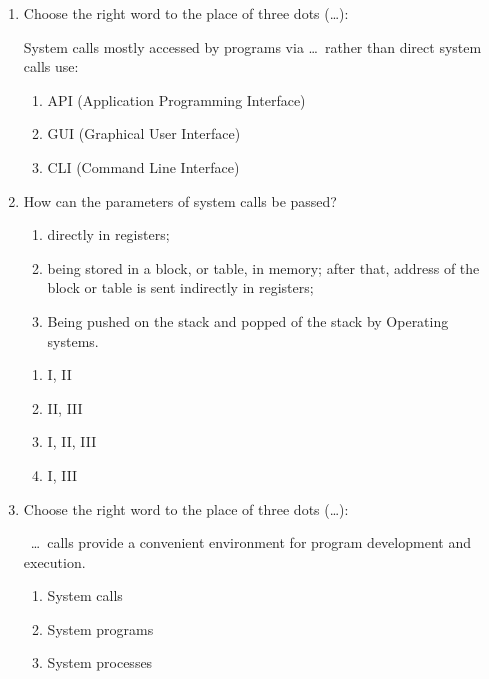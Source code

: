 \documentclass[paper=8.2in:11.6in]{scrartcl}
\begin{document}

\begin{enumerate}

\item Choose the right word to the place of three dots (\ldots):

System calls mostly accessed by programs via \ldots \ rather than direct system calls use:

\begin{enumerate}[label=\alph*)]

\item API (Application Programming Interface)
\item GUI (Graphical User Interface)
\item CLI (Command Line Interface)

\end{enumerate}

\item How can the parameters of system calls be passed?

\begin{enumerate}[label=\Roman*.]

\item directly in registers;
\item being stored in a block, or table, in memory; after that, address of the block or table is sent indirectly in registers;
\item Being pushed on the stack and popped of the stack by Operating systems.

\end{enumerate}

\begin{enumerate}[label=\alph*)]

\item I, II
\item II, III
\item I, II, III
\item I, III

\end{enumerate}

\item Choose the right word to the place of three dots (\ldots):

\ \ldots \ calls provide a convenient environment for program development and execution. 

\begin{enumerate}[label=\alph*)]

\item System calls
\item System programs
\item System processes


\end{enumerate}
\end{enumerate}
\end{document}
